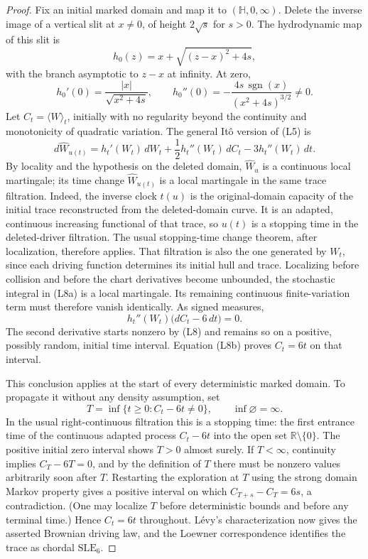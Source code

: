 \documentclass[11pt]{article}
\theoremstyle{definition}\newtheorem{definition}[theorem]{Definition}
\theoremstyle{remark}\newtheorem{remark}[theorem]{Remark}
\begin{document}
\begin{proof}
Fix an initial marked domain and map it to $(\mathbb H,0,\infty)$.
Delete the inverse image of a vertical slit at $x\ne0$, of height $2\sqrt s$
for $s>0$.  The hydrodynamic map of this slit is
\[
 h_0(z)=x+\sqrt{(z-x)^2+4s},
 \tag{L7}
\]
with the branch asymptotic to $z-x$ at infinity.  At zero,
\[
 h_0'(0)=\frac{|x|}{\sqrt{x^2+4s}},\qquad
 h_0''(0)=-\frac{4s\,\operatorname{sgn}(x)}{(x^2+4s)^{3/2}}\ne0.
 \tag{L8}
\]
Let $C_t=\langle W\rangle_t$, initially with no regularity beyond the
continuity and monotonicity of quadratic variation.  The general
It\^o version of (L5) is
\[
 d\widehat W_{u(t)}
   =h_t'(W_t)\,dW_t
       +\frac12h_t''(W_t)\,dC_t-3h_t''(W_t)\,dt.
 \tag{L8a}
\]
By locality and the hypothesis on the deleted domain,
$\widehat W_u$ is a continuous local martingale; its time change $\widehat W_{u(t)}$ is a local martingale in the same trace filtration. Indeed, the inverse clock $t(u)$ is the original-domain capacity of the initial trace reconstructed from the deleted-domain curve. It is an adapted, continuous increasing functional of that trace, so $u(t)$ is a stopping time in the deleted-driver filtration. The usual stopping-time change theorem, after localization, therefore applies.
That filtration is also the one generated by $W_t$, since each driving
function determines its initial hull and trace.  Localizing before collision
and before the chart derivatives become unbounded, the stochastic integral
in (L8a) is a local martingale.  Its remaining continuous finite-variation
term must therefore vanish identically.  As signed measures,
\[
 h_t''(W_t)\bigl(dC_t-6\,dt\bigr)=0.
 \tag{L8b}
\]
The second derivative starts nonzero by (L8) and remains so on a positive,
possibly random, initial time interval.  Equation (L8b) proves
$C_t=6t$ on that interval.

This conclusion applies at the start of every deterministic marked domain.
To propagate it without any density assumption, set
\[
 T=\inf\{t\geq0:C_t-6t\ne0\},\qquad \inf\varnothing=\infty.
\]
In the usual right-continuous filtration this is a stopping time: the first
entrance time of the continuous adapted process $C_t-6t$ into the open set
$\mathbb R\setminus\{0\}$.  The positive initial zero interval shows
$T>0$ almost surely.  If $T<\infty$, continuity implies $C_T-6T=0$, and by
the definition of $T$ there must be nonzero values arbitrarily soon after
$T$.  Restarting the exploration at $T$ using the strong domain Markov
property gives a positive interval on which
$C_{T+s}-C_T=6s$, a contradiction.  (One may localize $T$ before deterministic
bounds and before any terminal time.)  Hence $C_t=6t$ throughout.
L\'evy's characterization now gives the asserted Brownian driving law,
and the Loewner correspondence identifies the trace as chordal
$\mathrm{SLE}_6$.
\end{proof}
\end{document}
